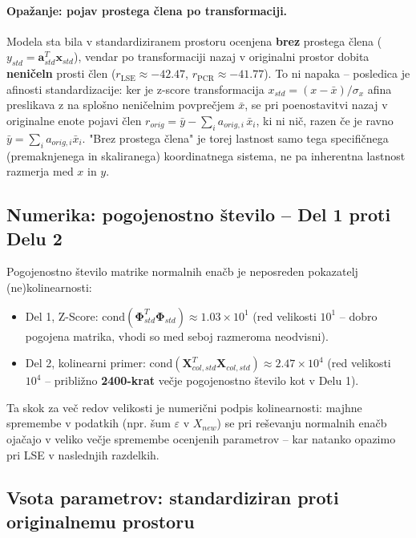 \documentclass[a4paper, 11pt]{article}
\begin{document}
\paragraph{Opažanje: pojav prostega člena po transformaciji.} Modela sta bila v standardiziranem prostoru
ocenjena \textbf{brez} prostega člena ($y_{std} = \mathbf{a}_{std}^T\mathbf{x}_{std}$),
vendar po transformaciji nazaj v originalni prostor dobita \textbf{neničeln} prosti
člen ($r_{\text{LSE}} \approx -42.47$, $r_{\text{PCR}} \approx -41.77$). To ni napaka --
posledica je afinosti standardizacije: ker je z-score transformacija
$x_{std} = (x - \bar{x})/\sigma_x$ afina preslikava z na splošno neničelnim povprečjem
$\bar{x}$, se pri poenostavitvi nazaj v originalne enote pojavi člen
$r_{orig} = \bar{y} - \sum_i a_{orig,i}\,\bar{x}_i$, ki ni nič, razen če je ravno
$\bar{y} = \sum_i a_{orig,i}\bar{x}_i$. "Brez prostega člena" je torej lastnost samo
tega specifičnega (premaknjenega in skaliranega) koordinatnega sistema, ne pa
inherentna lastnost razmerja med $x$ in $y$.

\subsection{Numerika: pogojenostno število -- Del 1 proti Delu 2}

Pogojenostno število matrike normalnih enačb je neposreden pokazatelj (ne)kolinearnosti:

\begin{itemize}
    \item Del 1, Z-Score: $\mathrm{cond}(\mathbf{\Phi}_{std}^T\mathbf{\Phi}_{std}) \approx 1.03\times10^{1}$
    (red velikosti $10^1$ -- dobro pogojena matrika, vhodi so med seboj razmeroma neodvisni).
    \item Del 2, kolinearni primer: $\mathrm{cond}(\mathbf{X}_{col,std}^T\mathbf{X}_{col,std}) \approx 2.47\times10^{4}$
    (red velikosti $10^4$ -- približno \textbf{2400-krat} večje pogojenostno število kot
    v Delu 1).
\end{itemize}

Ta skok za več redov velikosti je numerični podpis kolinearnosti: majhne spremembe v
podatkih (npr. šum $\varepsilon$ v $X_{new}$) se pri reševanju normalnih enačb ojačajo v
veliko večje spremembe ocenjenih parametrov -- kar natanko opazimo pri LSE v naslednjih
razdelkih.

\subsection{Vsota parametrov: standardiziran proti originalnemu prostoru}
\label{sec:vsota}
\end{document}
